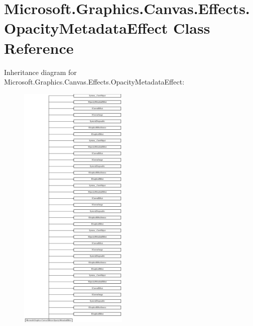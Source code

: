 \hypertarget{class_microsoft_1_1_graphics_1_1_canvas_1_1_effects_1_1_opacity_metadata_effect}{}\section{Microsoft.\+Graphics.\+Canvas.\+Effects.\+Opacity\+Metadata\+Effect Class Reference}
\label{class_microsoft_1_1_graphics_1_1_canvas_1_1_effects_1_1_opacity_metadata_effect}
Inheritance diagram for Microsoft.\+Graphics.\+Canvas.\+Effects.\+Opacity\+Metadata\+Effect\+:\begin{figure}[H]
\begin{center}
\leavevmode
\includegraphics[height=12.000000cm]{class_microsoft_1_1_graphics_1_1_canvas_1_1_effects_1_1_opacity_metadata_effect}
\end{center}
\end{figure}
